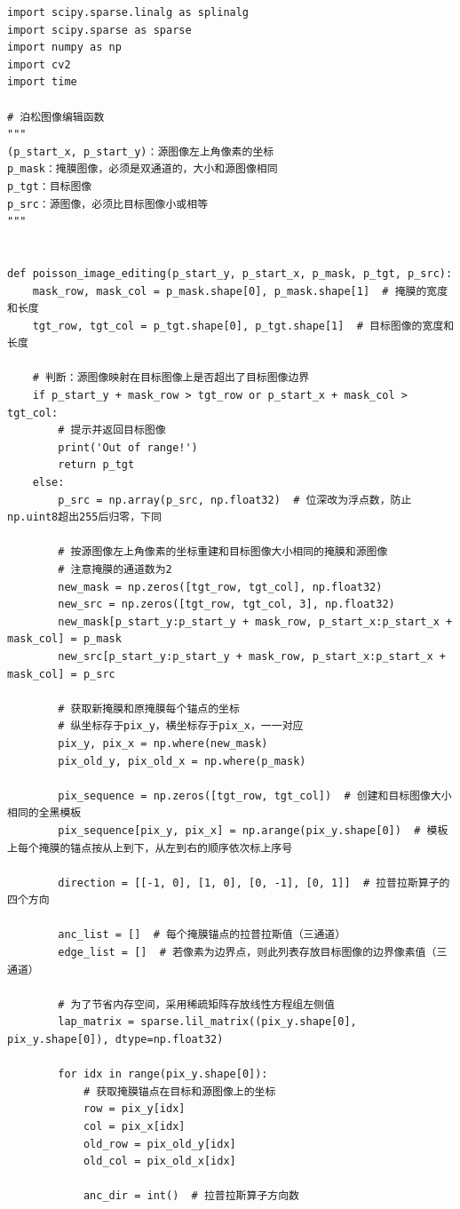 \documentclass[12pt, a4paper, oneside]{report}
\begin{document}
	\begin{lstlisting}
import scipy.sparse.linalg as splinalg
import scipy.sparse as sparse
import numpy as np
import cv2
import time

# 泊松图像编辑函数
"""
(p_start_x, p_start_y)：源图像左上角像素的坐标
p_mask：掩膜图像，必须是双通道的，大小和源图像相同
p_tgt：目标图像
p_src：源图像，必须比目标图像小或相等
"""


def poisson_image_editing(p_start_y, p_start_x, p_mask, p_tgt, p_src):
	mask_row, mask_col = p_mask.shape[0], p_mask.shape[1]  # 掩膜的宽度和长度
	tgt_row, tgt_col = p_tgt.shape[0], p_tgt.shape[1]  # 目标图像的宽度和长度
	
	# 判断：源图像映射在目标图像上是否超出了目标图像边界
	if p_start_y + mask_row > tgt_row or p_start_x + mask_col > tgt_col:
		# 提示并返回目标图像
		print('Out of range!')
		return p_tgt
	else:
		p_src = np.array(p_src, np.float32)  # 位深改为浮点数，防止np.uint8超出255后归零，下同
		
		# 按源图像左上角像素的坐标重建和目标图像大小相同的掩膜和源图像
		# 注意掩膜的通道数为2
		new_mask = np.zeros([tgt_row, tgt_col], np.float32)
		new_src = np.zeros([tgt_row, tgt_col, 3], np.float32)
		new_mask[p_start_y:p_start_y + mask_row, p_start_x:p_start_x + mask_col] = p_mask
		new_src[p_start_y:p_start_y + mask_row, p_start_x:p_start_x + mask_col] = p_src
		
		# 获取新掩膜和原掩膜每个锚点的坐标
		# 纵坐标存于pix_y，横坐标存于pix_x，一一对应
		pix_y, pix_x = np.where(new_mask)
		pix_old_y, pix_old_x = np.where(p_mask)
		
		pix_sequence = np.zeros([tgt_row, tgt_col])  # 创建和目标图像大小相同的全黑模板
		pix_sequence[pix_y, pix_x] = np.arange(pix_y.shape[0])  # 模板上每个掩膜的锚点按从上到下，从左到右的顺序依次标上序号
		
		direction = [[-1, 0], [1, 0], [0, -1], [0, 1]]  # 拉普拉斯算子的四个方向
		
		anc_list = []  # 每个掩膜锚点的拉普拉斯值（三通道）
		edge_list = []  # 若像素为边界点，则此列表存放目标图像的边界像素值（三通道）
		
		# 为了节省内存空间，采用稀疏矩阵存放线性方程组左侧值
		lap_matrix = sparse.lil_matrix((pix_y.shape[0], pix_y.shape[0]), dtype=np.float32)
		
		for idx in range(pix_y.shape[0]):
			# 获取掩膜锚点在目标和源图像上的坐标
			row = pix_y[idx]
			col = pix_x[idx]
			old_row = pix_old_y[idx]
			old_col = pix_old_x[idx]
			
			anc_dir = int()  # 拉普拉斯算子方向数
			

\end{lstlisting}
\end{document}
